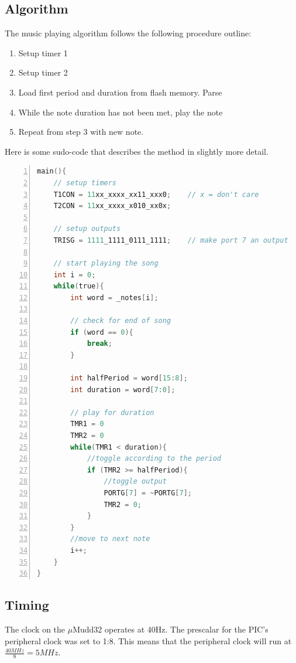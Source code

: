 \documentclass[11pt]{article}
\begin{document}
\subsection{Algorithm}

The music playing algorithm follows the following procedure outline:

\begin{enumerate}
	\item Setup timer 1
	\item Setup timer 2
	\item Load first period and duration from flash memory. Parse
	\item While the note duration has not been met, play the note
	\item Repeat from step 3 with new note.
\end{enumerate}

Here is some sudo-code that describes the method in slightly more detail.

\begin{lstlisting}[numbers=left,language=C,basicstyle=\footnotesize]
main(){
    // setup timers
    T1CON = 11xx_xxxx_xx11_xxx0;    // x = don't care
    T2CON = 11xx_xxxx_x010_xx0x;

    // setup outputs
    TRISG = 1111_1111_0111_1111;    // make port 7 an output

    // start playing the song
    int i = 0;
    while(true){
        int word = _notes[i];

        // check for end of song
        if (word == 0){
            break;
        }

        int halfPeriod = word[15:8];
        int duration = word[7:0];

        // play for duration
        TMR1 = 0
        TMR2 = 0
        while(TMR1 < duration){
            //toggle according to the period
            if (TMR2 >= halfPeriod){
                //toggle output
                PORTG[7] = ~PORTG[7];
                TMR2 = 0;
            }
        }
        //move to next note
        i++;
    }
}

\end{lstlisting}


\subsection{Timing}

The clock on the $\mu$Mudd32 operates at 40Hz. The prescalar for the PIC's peripheral clock was set to 1:8. This means that the peripheral clock will run at $\frac{40MHz}{8} = 5MHz$. \\
\end{document}
